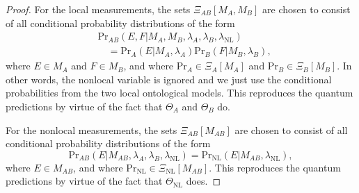 \documentclass[DIV=calc,paper=a4,fontsize=11pt,twocolumn]{scrartcl} %
\theoremstyle{definition}
\theoremstyle{plain}
\begin{document}
\begin{proof}
For the local measurements, the sets $\Xi_{AB}[M_A,M_B]$ are chosen
to consist of all conditional probability distributions of the form
\begin{align}
&\text{Pr}_{AB}(E,F|M_A,M_B,\lambda_A,\lambda_B,\lambda_{\text{NL}})\nonumber\\
&\quad = \text{Pr}_A(E|M_A,\lambda_A) \text{Pr}_B(F|M_B,\lambda_B),
\end{align}
where $E \in M_A$ and $F \in M_B$, and where $\text{Pr}_A \in
\Xi_A[M_A]$ and $\text{Pr}_B \in \Xi_B[M_B]$.  In other words, the
nonlocal variable is ignored and we just use the conditional
probabilities from the two local ontological models.  This
reproduces the quantum predictions by virtue of the fact that
$\Theta_A$ and $\Theta_B$ do.

For the nonlocal measurements, the sets $\Xi_{AB}[M_{AB}]$ are
chosen to consist of all conditional probability distributions of
the form
\begin{equation}
\text{Pr}_{AB}(E|M_{AB},\lambda_A,\lambda_B,\lambda_{\text{NL}})
= \text{Pr}_{\text{NL}}(E|M_{AB},\lambda_{\text{NL}}),
\end{equation}
where $E \in M_{AB}$, and where $\text{Pr}_{\text{NL}} \in
\Xi_{\text{NL}}[M_{AB}]$.  This reproduces the quantum predictions
by virtue of the fact that $\Theta_{\text{NL}}$ does.
\end{proof}
\end{document}
